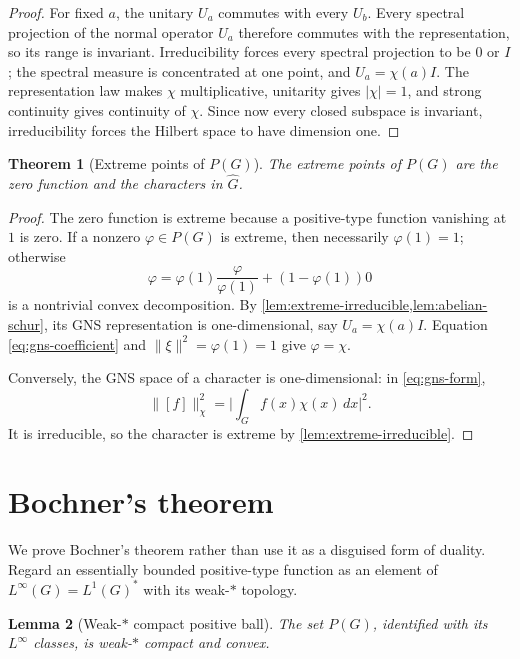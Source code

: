 \documentclass[11pt]{article}
\newtheorem{theorem}{Theorem}[section]
\newtheorem{lemma}[theorem]{Lemma}
\theoremstyle{definition}
\theoremstyle{remark}
\newcommand{\Lp}[1]{L^{#1}}
\newcommand{\dual}[1]{\widehat{#1}}
\newcommand{\abs}[1]{\lvert #1\rvert}
\newcommand{\norm}[1]{\lVert #1\rVert}
\begin{document}
\begin{proof}
For fixed $a$, the unitary $U_a$ commutes with every $U_b$.  Every spectral projection
of the normal operator $U_a$ therefore commutes with the representation, so its range is
invariant.  Irreducibility forces every spectral projection to be $0$ or $I$; the spectral
measure is concentrated at one point, and $U_a=\chi(a)I$.  The representation law makes
$\chi$ multiplicative, unitarity gives $\abs\chi=1$, and strong continuity gives
continuity of $\chi$.  Since now every closed subspace is invariant, irreducibility forces
the Hilbert space to have dimension one.
\end{proof}

\begin{theorem}[Extreme points of $P(G)$]
\label{thm:extreme-characters}
The extreme points of $P(G)$ are the zero function and the characters in $\dual G$.
\end{theorem}

\begin{proof}
The zero function is extreme because a positive-type function vanishing at $1$ is zero.
If a nonzero $\varphi\in P(G)$ is extreme, then necessarily $\varphi(1)=1$; otherwise
\[
 \varphi=\varphi(1)\frac{\varphi}{\varphi(1)}+(1-\varphi(1))0
\]
is a nontrivial convex decomposition.  By
\cref{lem:extreme-irreducible,lem:abelian-schur}, its GNS representation is
one-dimensional, say $U_a=\chi(a)I$.  Equation \eqref{eq:gns-coefficient} and
$\norm\xi^2=\varphi(1)=1$ give $\varphi=\chi$.

Conversely, the GNS space of a character is one-dimensional: in
\eqref{eq:gns-form},
\[
 \norm{[f]}_\chi^2
 =\abs{\int_Gf(x)\chi(x)\,dx}^2.
\]
It is irreducible, so the character is extreme by
\cref{lem:extreme-irreducible}.
\end{proof}

\section{Bochner's theorem}
\label{sec:bochner}

We prove Bochner's theorem rather than use it as a disguised form of duality.  Regard an
essentially bounded positive-type function as an element of
$\Lp\infty(G)=\Lp1(G)^*$ with its weak-$*$ topology.

\begin{lemma}[Weak-$*$ compact positive ball]
\label{lem:P-weakstar-compact}
The set $P(G)$, identified with its $\Lp\infty$ classes, is weak-$*$ compact and convex.
\end{lemma}
\end{document}
